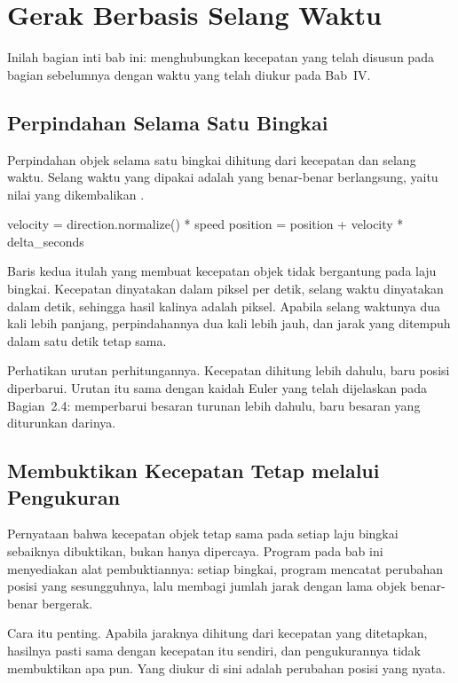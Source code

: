 \section{Gerak Berbasis Selang Waktu}
\label{sec:gerak-selang-waktu}

Inilah bagian inti bab ini: menghubungkan kecepatan yang telah disusun pada
bagian sebelumnya dengan waktu yang telah diukur pada Bab~IV.

\subsection{Perpindahan Selama Satu Bingkai}

Perpindahan objek selama satu bingkai dihitung dari kecepatan dan selang
waktu. Selang waktu yang dipakai adalah yang benar-benar
berlangsung, yaitu nilai yang dikembalikan .

\begin{kodekeluaran}
velocity = direction.normalize() * speed
position = position + velocity * delta_seconds
\end{kodekeluaran}

Baris kedua itulah yang membuat kecepatan objek tidak bergantung pada laju
bingkai. Kecepatan dinyatakan dalam piksel per detik, selang waktu dinyatakan
dalam detik, sehingga hasil kalinya adalah piksel. Apabila selang waktunya
dua kali lebih panjang, perpindahannya dua kali lebih jauh, dan jarak yang
ditempuh dalam satu detik tetap sama.

Perhatikan urutan perhitungannya. Kecepatan dihitung lebih dahulu, baru
posisi diperbarui. Urutan itu sama dengan kaidah Euler yang telah dijelaskan
pada Bagian~2.4: memperbarui besaran turunan lebih dahulu, baru besaran yang
diturunkan darinya.

\subsection{Membuktikan Kecepatan Tetap melalui Pengukuran}

Pernyataan bahwa kecepatan objek tetap sama pada setiap laju bingkai sebaiknya
dibuktikan, bukan hanya dipercaya. Program pada bab ini menyediakan alat
pembuktiannya: setiap bingkai, program mencatat perubahan posisi yang
sesungguhnya, lalu membagi jumlah jarak dengan lama objek benar-benar
bergerak.

Cara itu penting. Apabila jaraknya dihitung dari kecepatan yang ditetapkan,
hasilnya pasti sama dengan kecepatan itu sendiri, dan pengukurannya tidak
membuktikan apa pun. Yang diukur di sini adalah perubahan posisi yang nyata.

